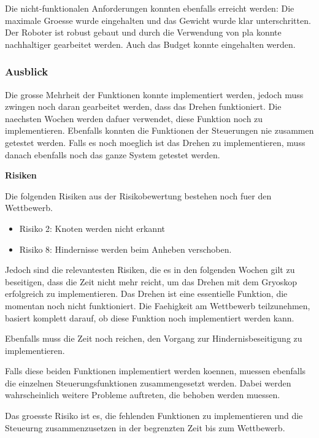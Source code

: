 Die nicht-funktionalen Anforderungen konnten ebenfalls erreicht werden: Die maximale Groesse wurde eingehalten und das Gewicht wurde klar unterschritten. Der Roboter ist robust gebaut und durch die Verwendung von \acrshort{pla} konnte nachhaltiger gearbeitet werden. Auch das Budget konnte eingehalten werden.

\subsubsection{Ausblick}

Die grosse Mehrheit der Funktionen konnte implementiert werden, jedoch muss zwingen noch daran gearbeitet werden, dass das Drehen funktioniert. Die naechsten Wochen werden dafuer verwendet, diese Funktion noch zu implementieren. Ebenfalls konnten die Funktionen der Steuerungen nie zusammen getestet werden. Falls es noch moeglich ist das Drehen zu implementieren, muss danach ebenfalls noch das ganze System getestet werden.

\textbf{Risiken}

Die folgenden Risiken aus der Risikobewertung bestehen noch fuer den Wettbewerb. 

\begin{itemize}
    \item Risiko 2: Knoten werden nicht erkannt
    \item Risiko 8: Hindernisse werden beim Anheben verschoben.
\end{itemize}

Jedoch sind die relevantesten Risiken, die es in den folgenden Wochen gilt zu beseitigen, dass die Zeit nicht mehr reicht, um das Drehen mit dem Gryoskop erfolgreich zu implementieren. Das Drehen ist eine essentielle Funktion, die momentan noch nicht funktioniert. Die Faehigkeit am Wettbewerb teilzunehmen, basiert komplett darauf, ob diese Funktion noch implementiert werden kann.

Ebenfalls muss die Zeit noch reichen, den Vorgang zur Hindernisbeseitigung zu implementieren.

Falls diese beiden Funktionen implementiert werden koennen, muessen ebenfalls die einzelnen Steuerungsfunktionen zusammengesetzt werden. Dabei werden wahrscheinlich weitere Probleme auftreten, die behoben werden muessen.

Das groesste Risiko ist es, die fehlenden Funktionen zu implementieren und die Steueurng zusammenzusetzen in der begrenzten Zeit bis zum Wettbewerb.



